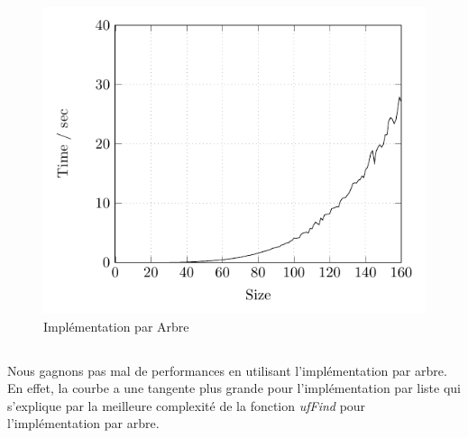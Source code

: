 	\begin{figure}[h]
		\caption{Implémentation par Arbre}
		\includegraphics{Tests/Tree/tree}
	\end{figure}

\subsection{} %
	Nous gagnons pas mal de performances en utilisant l'implémentation par arbre. En effet, la courbe a une tangente plus grande pour l'implémentation par liste qui s'explique par la meilleure complexité de la fonction \textit{ufFind} pour l'implémentation par arbre.


